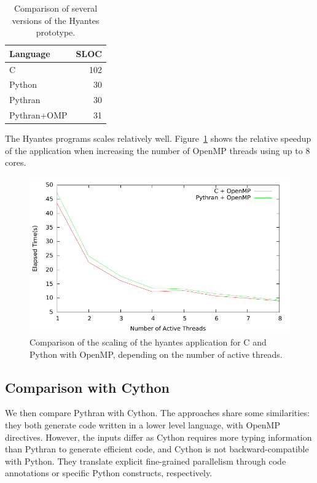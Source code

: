\documentclass[conference]{IEEEtran}
\begin{document}
\begin{table}

    \caption{Comparison of several versions of the Hyantes prototype.}
    \label{tbl:hyantes}

    \centering
    \begin{tabular}{|l|r|}
        \hline
        Language & SLOC  \\
        \hline
        C       & 102   \\
        Python  & 30    \\
        Pythran & 30     \\
        Pythran+OMP    & 31  \\
        \hline
    \end{tabular}

\end{table}


The Hyantes programs scales relatively well. Figure~\ref{fig:hyantes-speedup} shows
the relative speedup of the application when increasing the number of OpenMP
threads using up to 8 cores.

\begin{figure}

    \caption{Comparison of the scaling of the hyantes application for C and
    Python with OpenMP, depending on the number of active threads.}
    \label{fig:hyantes-speedup}

    \includegraphics[width=.5\textwidth]{hyantes_omp_bench.pdf}

\end{figure}


\subsection{Comparison with Cython}

We then compare Pythran with Cython. The approaches share some similarities:
they both generate code written in a lower level language, with OpenMP
directives. However, the inputs differ as Cython requires more typing
information than Pythran to generate efficient code, and Cython is not
backward-compatible with Python. They translate explicit fine-grained
parallelism through code annotations or specific Python constructs,
respectively.
\end{document}
